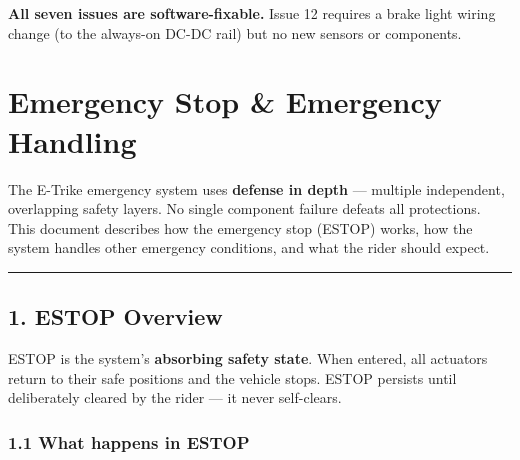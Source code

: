 \documentclass[12pt,a4paper,oneside]{report}
\begin{document}
\textbf{All seven issues are software-fixable.} Issue 12 requires a brake light
wiring change (to the always-on DC-DC rail) but no new sensors or components.


\chapter{Emergency Stop \& Emergency
Handling}\label{emergency-stop-emergency-handling}

The E-Trike emergency system uses \textbf{defense in depth} --- multiple
independent, overlapping safety layers. No single component failure defeats all
protections. This document describes how the emergency stop (ESTOP) works, how
the system handles other emergency conditions, and what the rider should expect.

\begin{center}\rule{0.5\linewidth}{0.5pt}\end{center}

\section{1. ESTOP Overview}\label{estop-overview}

ESTOP is the system's \textbf{absorbing safety state}. When entered, all
actuators return to their safe positions and the vehicle stops. ESTOP persists
until deliberately cleared by the rider --- it never self-clears.

\subsection{1.1 What happens in ESTOP}\label{what-happens-in-estop}
\end{document}
